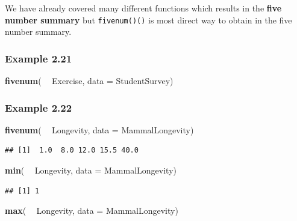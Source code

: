\documentclass[]{book}
\newenvironment{Shaded}{\begin{snugshade}}{\end{snugshade}}
\newcommand{\DataTypeTok}[1]{\textcolor[rgb]{0.13,0.29,0.53}{#1}}
\newcommand{\KeywordTok}[1]{\textcolor[rgb]{0.13,0.29,0.53}{\textbf{#1}}}
\newcommand{\NormalTok}[1]{#1}
\newcommand{\OperatorTok}[1]{\textcolor[rgb]{0.81,0.36,0.00}{\textbf{#1}}}
\newcommand{\StringTok}[1]{\textcolor[rgb]{0.31,0.60,0.02}{#1}}
\begin{document}
We have already covered many different functions which results in the \textbf{five number summary} but \texttt{fivenum()()} is most direct way to obtain in the five number summary.

\hypertarget{example-2.21}{%
\subsubsection{Example 2.21}\label{example-2.21}}

\begin{Shaded}
\begin{Highlighting}[]
\KeywordTok{fivenum}\NormalTok{( }\OperatorTok{~}\StringTok{ }\NormalTok{Exercise, }\DataTypeTok{data =}\NormalTok{ StudentSurvey)}
\end{Highlighting}
\end{Shaded}

\hypertarget{example-2.22}{%
\subsubsection{Example 2.22}\label{example-2.22}}

\begin{Shaded}
\begin{Highlighting}[]
\KeywordTok{fivenum}\NormalTok{( }\OperatorTok{~}\StringTok{ }\NormalTok{Longevity, }\DataTypeTok{data =}\NormalTok{ MammalLongevity)}
\end{Highlighting}
\end{Shaded}

\begin{verbatim}
## [1]  1.0  8.0 12.0 15.5 40.0
\end{verbatim}

\begin{Shaded}
\begin{Highlighting}[]
\KeywordTok{min}\NormalTok{( }\OperatorTok{~}\StringTok{ }\NormalTok{Longevity, }\DataTypeTok{data =}\NormalTok{ MammalLongevity) }
\end{Highlighting}
\end{Shaded}

\begin{verbatim}
## [1] 1
\end{verbatim}

\begin{Shaded}
\begin{Highlighting}[]
\KeywordTok{max}\NormalTok{( }\OperatorTok{~}\StringTok{ }\NormalTok{Longevity, }\DataTypeTok{data =}\NormalTok{ MammalLongevity) }
\end{Highlighting}
\end{Shaded}
\end{document}
